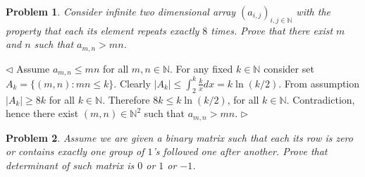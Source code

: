\documentclass[12pt]{article}
\newtheorem{problem}{Problem}[subsection]
\newenvironment{solution}{\par $\triangleleft$}{$\triangleright$}
\begin{document}
\begin{problem} Consider infinite two dimensional array
${(a_{i,j})}_{i,j\in\mathbb{N}}$ with the property that each its element repeats
exactly $8$ times. Prove that there exist $m$ and $n$ such that $a_{m,n}> mn$.
\end{problem}
\begin{solution} Assume $a_{m,n}\leq mn$ for all $m,n\in\mathbb{N}$. For any
    fixed $k\in\mathbb{N}$  consider set $A_k=\{(m,n):mn\leq k\}$. Clearly
    $|A_k|\leq \int_2^k \frac{k}{x}dx=k\ln(k/2)$. From assumption $|A_k|\geq 8k$
    for all $k\in\mathbb{N}$. Therefore $8k\leq k\ln(k/2)$, for all
    $k\in\mathbb{N}$. Contradiction, hence there exist $(m,n)\in\mathbb{N}^2$
    such that $a_{m,n}>mn$.
\end{solution}

\begin{problem} Assume we are given a binary matrix such that each its row is
zero or contains exactly one group of $1$'s followed one after another. Prove
that determinant of such matrix is $0$ or $1$ or $-1$.
\end{problem}
\end{document}
